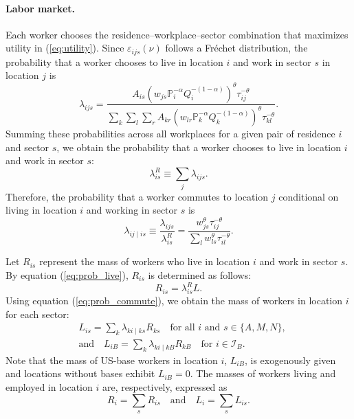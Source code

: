 \documentclass[12pt, unicode, a4paper]{article}
\newcommand{\1}{\mbox{1}\hspace{-0.25em}\mbox{l}} %
\begin{document}
\paragraph{Labor market.}
Each worker chooses the residence--workplace--sector combination that maximizes utility in (\ref{eq:utility}). Since $\varepsilon_{ijs}(\nu)$ follows a Fr\'{e}chet distribution, the probability that a worker chooses to live in location $i$ and work in sector $s$ in location $j$ is
\begin{equation}
\label{eq:prob_live_work}
    \lambda_{ijs}=
    \frac{A_{is}\left( w_{js} \mathbb{P}_{i}^{-\alpha} Q_i^{-(1-\alpha)} \right)^\theta \tau_{ij}^{-\theta}}{\sum_k \sum_l \sum_r A_{kr}\left( w_{lr} \mathbb{P}_{k}^{-\alpha} Q_k^{-(1-\alpha)} \right)^\theta \tau_{kl}^{-\theta}}.
\end{equation}
Summing these probabilities across all workplaces for a given pair of residence $i$ and sector $s$, we obtain the probability that a worker chooses to live in location $i$ and work in sector $s$:
\begin{equation}
\label{eq:prob_live}
    \lambda_{is}^R \equiv \sum_j \lambda_{ijs}.
\end{equation}
Therefore, the probability that a worker commutes to location $j$ conditional on living in location $i$ and working in sector $s$ is
\begin{equation}
\label{eq:prob_commute}
    \lambda_{ij \mid is} \equiv \frac{\lambda_{ijs}}{\lambda_{is}^R}=
    \frac{w_{js}^\theta \tau_{ij}^{-\theta}}{\sum_l w_{ls}^\theta \tau_{il}^{-\theta}}.
\end{equation}

Let $R_{is}$ represent the mass of workers who live in location $i$ and work in sector $s$. By equation (\ref{eq:prob_live}), $R_{is}$ is determined as follows:
\begin{equation}
\label{eq:residents}
    R_{is}=\lambda_{is}^R L.
\end{equation}
Using equation (\ref{eq:prob_commute}), we obtain the mass of workers in location $i$ for each sector:
\begin{equation}
\label{eq:workers}
\begin{split}
    & L_{is}=\sum_k\lambda_{ki \mid ks}R_{ks}
    \quad \mbox{for all $i$ and $s \in \{ A,M,N \}$} ,\\
    &\mbox{and}\quad
    L_{iB}=\sum_k\lambda_{ki \mid kB}R_{kB}
    \quad \mbox{for $i \in \mathcal{I}_B$}.
\end{split}
\end{equation}
Note that the mass of US-base workers in location $i$, $L_{iB}$, is exogenously given and locations without bases exhibit $L_{iB}=0$. The masses of workers living and employed in location $i$ are, respectively, expressed as
\begin{equation}
\label{eq:total_pop}
    R_i=\sum_s R_{is} \quad \mbox{and} \quad L_i=\sum_s L_{is}.
\end{equation}
\end{document}
